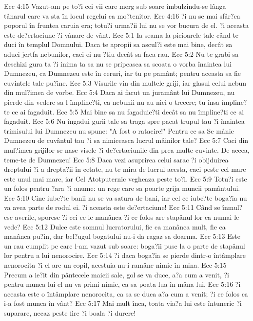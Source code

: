 Ecc 4:15  Vazut-am pe to?i cei vii care merg sub soare îmbulzindu-se lânga tânarul care va sta în locul regelui ca mo?tenitor.
Ecc 4:16  ?i nu se mai sfâr?ea poporul în fruntea caruia era; totu?i urma?ii lui nu se vor bucura de el. ?i aceasta este de?ertaciune ?i vânare de vânt.
Ecc 5:1  Ia seama la picioarele tale când te duci în templul Domnului. Daca te apropii sa ascul?i este mai bine, decât sa aduci jertfa nebunilor, caci ei nu ?tiu decât sa faca rau.
Ecc 5:2  Nu te grabi sa deschizi gura ta ?i inima ta sa nu se pripeasca sa scoata o vorba înaintea lui Dumnezeu, ca Dumnezeu este în ceruri, iar tu pe pamânt; pentru aceasta sa fie cuvintele tale pu?ine.
Ecc 5:3  Visurile vin din multele griji, iar glasul celui nebun din mul?imea de vorbe.
Ecc 5:4  Daca ai facut un juramânt lui Dumnezeu, nu pierde din vedere sa-l împline?ti, ca nebunii nu au nici o trecere; tu însa împline?te ce ai fagaduit.
Ecc 5:5  Mai bine sa nu fagaduie?ti decât sa nu împline?ti ce ai fagaduit.
Ecc 5:6  Nu îngadui gurii tale sa traga spre pacat trupul tau ?i înaintea trimisului lui Dumnezeu nu spune: "A fost o ratacire!" Pentru ce sa Se mânie Dumnezeu de cuvântul tau ?i sa nimiceasca lucrul mâinilor tale?
Ecc 5:7  Caci din mul?imea grijilor se nasc visele ?i de?ertaciunile din prea multe cuvinte. De aceea, teme-te de Dumnezeu!
Ecc 5:8  Daca vezi asuprirea celui sarac ?i obijduirea dreptului ?i a drepta?ii în cetate, nu te mira de lucrul acesta, caci peste cel mare este unul mai mare, iar Cel Atotputernic vegheaza peste to?i.
Ecc 5:9  Totu?i este un folos pentru ?ara ?i anume: un rege care sa poarte grija muncii pamântului.
Ecc 5:10  Cine iube?te banii nu se va satura de bani, iar cel ce iube?te boga?ia nu va avea parte de rodul ei. ?i aceasta este de?ertaciune!
Ecc 5:11  Când se înmul?esc averile, sporesc ?i cei ce le manânca ?i ce folos are stapânul lor ca numai le vede?
Ecc 5:12  Dulce este somnul lucratorului, fie ca manânca mult, fie ca manânca pu?in, dar bel?ugul bogatului nu-i da ragaz sa doarma.
Ecc 5:13  Este un rau cumplit pe care l-am vazut sub soare: boga?ii puse la o parte de stapânul lor pentru a lui nenorocire.
Ecc 5:14  ?i daca boga?ia se pierde dintr-o întâmplare nenorocita ?i el are un copil, acestuia nu-i ramâne nimic în mina.
Ecc 5:15  Precum a ie?it din pântecele maicii sale, gol se va duce, a?a cum a venit, ?i pentru munca lui el nu va primi nimic, ca sa poata lua în mâna lui.
Ecc 5:16  ?i aceasta este o întâmplare nenorocita, ca sa se duca a?a cum a venit; ?i ce folos ca i-a fost munca în vânt?
Ecc 5:17  Mai mult înca, toata via?a lui este întuneric ?i suparare, necaz peste fire ?i boala ?i durere!
